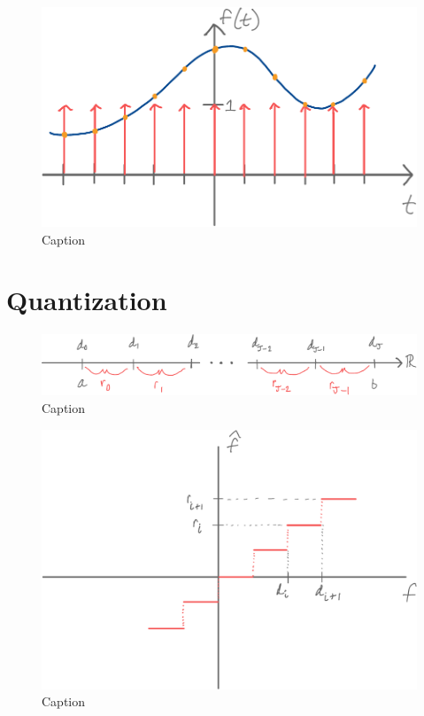 \documentclass[11pt]{article}
\begin{document}
\begin{figure}
    \centering
    \includegraphics[width=\textwidth]{figures/lecture01/sampling-an-arbitrary-function.pdf}
    \caption{Caption}
    \label{fig:sampling an arbitary function}
\end{figure}


\section{Quantization}


\begin{figure}
    \centering
    \includegraphics[width=\textwidth]{figures/lecture01/quantization-ranges.pdf}
    \caption{Caption}
    \label{fig:sampling function}
\end{figure}

\begin{figure}
    \centering
    \includegraphics[width=\textwidth]{figures/lecture01/quantization-transfer-function.pdf}
    \caption{Caption}
    \label{fig:sampling an arbitary function}
\end{figure}
\end{document}
